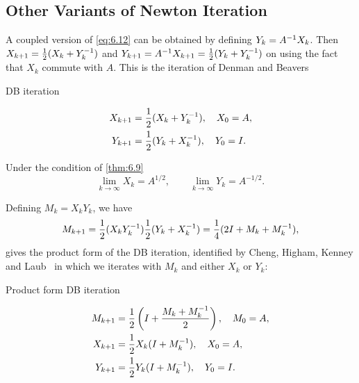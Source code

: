 \documentclass{article}
\begin{document}
\subsection{Other Variants of Newton Iteration}
A coupled version of \eqref{eq:6.12} can be obtained by defining
$Y_k = A^{-1} X_k$. Then $X_{k + 1} = \frac{1}{2}(X_k + Y_k^{-1})$ and
$Y_{k+1} = A^{-1} X_{k+1} = \frac{1}{2}(Y_k + Y_k^{-1})$ on using the fact
that $X_k$ commute with $A$. This is the iteration of Denman and
Beavers~\cite{debe76}
\begin{mybox}{}
  \begin{center}
    \textsf{DB iteration}
  \end{center}
  \begin{equation}
    \label{eq:6.15}
    \begin{aligned}
      X_{k + 1} & = \frac{1}{2}(X_k + Y_k^{-1}), \quad X_0 = A, \\
      Y_{k + 1} & = \frac{1}{2}(Y_k + X_k^{-1}), \quad Y_0 = I.
    \end{aligned}
  \end{equation}
\end{mybox}
Under the condition of \ref{thm:6.9}
\begin{equation}\label{eq:6.16}
  \lim_{k \to \infty} X_k = A^{1/2}, \qquad \lim_{k\to \infty}Y_k =
  A^{-1/2}. 
\end{equation}

Defining $M_k = X_kY_k$, we have
\begin{equation}\notag
  M_{k+1} = \frac{1}{2}(X_kY_k^{-1})\frac{1}{2}(Y_k + X_k^{-1}) =
  \frac{1}{4}(2I + M_k + M_k^{-1}),
\end{equation}
gives the product form of the DB iteration, identified by Cheng, Higham,
Kenney and Laub~\cite{chkl01} in which we iterates with $M_k$ and either
$X_k$ or $Y_k$:
\begin{mybox}{}
  \begin{center}
    \textsf{Product form DB iteration}
  \end{center}
  \begin{equation}
    \label{eq:6.17}
    \begin{aligned}
      M_{k + 1} &= \frac{1}{2}\left(I + \frac{M_k + M_k^{-1}}{2}\right),
                  \quad M_0 = A,\\ 
      X_{k + 1} &= \frac{1}{2}X_k(I + M_k^{-1}), \quad X_0 = A, \\ 
      Y_{k + 1} &= \frac{1}{2}Y_k(I + M_k^{-1}), \quad Y_0 = I.
    \end{aligned}
  \end{equation}
\end{mybox}
\end{document}
